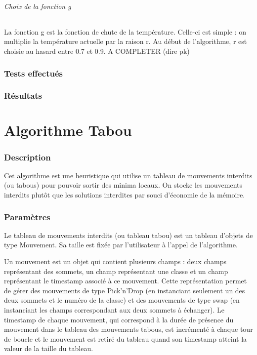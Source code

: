 \documentclass[12pt]{article}
\begin{document}
\paragraph{Choix de la fonction g} La fonction g est la fonction de chute de la température. Celle-ci est simple : on multiplie la température actuelle par la raison r. Au début de l’algorithme, r est choisie au hasard entre 0.7 et 0.9. A COMPLETER (dire pk)

\section{Tests effectués}
\section{Résultats}

\newpage

\part{Algorithme Tabou}
\section{Description}
Cet algorithme est une heuristique qui utilise un tableau de mouvements interdits (ou tabous) pour pouvoir sortir des minima locaux. On stocke les mouvements interdits plutôt que les solutions interdites par souci d’économie de la mémoire.

\section{Paramètres}
Le tableau de mouvements interdits (ou tableau tabou) est un tableau d’objets de type Mouvement. Sa taille est fixée par l’utilisateur à l’appel de l’algorithme.

Un mouvement est un objet qui contient plusieurs champs : deux champs représentant des sommets, un champ représentant une classe et un champ représentant le timestamp associé à ce mouvement. Cette représentation permet de gérer des mouvements de type Pick’n’Drop (en instanciant seulement un des deux sommets et le numéro de la classe) et des mouvements de type swap (en instanciant les champs correspondant aux deux sommets à échanger).
Le timestamp de chaque mouvement, qui correspond à la durée de présence du mouvement dans le tableau des mouvements tabous, est incrémenté à chaque tour de boucle et le mouvement est retiré du tableau quand son timestamp atteint la valeur de la taille du tableau.
\end{document}
